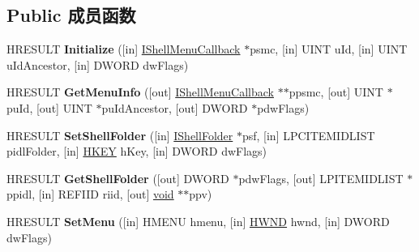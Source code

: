 \subsection*{Public 成员函数}
\begin{DoxyCompactItemize}
\item 
\mbox{\label{interface_i_shell_menu_a96d9507bef0bb926b6185d1bac06fb03}} 
H\+R\+E\+S\+U\+LT {\bfseries Initialize} (\mbox{[}in\mbox{]} \hyperlink{interface_i_shell_menu_callback}{I\+Shell\+Menu\+Callback} $\ast$psmc, \mbox{[}in\mbox{]} U\+I\+NT u\+Id, \mbox{[}in\mbox{]} U\+I\+NT u\+Id\+Ancestor, \mbox{[}in\mbox{]} D\+W\+O\+RD dw\+Flags)
\item 
\mbox{\label{interface_i_shell_menu_a45d493f271fe3248526d3bc00c55356f}} 
H\+R\+E\+S\+U\+LT {\bfseries Get\+Menu\+Info} (\mbox{[}out\mbox{]} \hyperlink{interface_i_shell_menu_callback}{I\+Shell\+Menu\+Callback} $\ast$$\ast$ppsmc, \mbox{[}out\mbox{]} U\+I\+NT $\ast$pu\+Id, \mbox{[}out\mbox{]} U\+I\+NT $\ast$pu\+Id\+Ancestor, \mbox{[}out\mbox{]} D\+W\+O\+RD $\ast$pdw\+Flags)
\item 
\mbox{\label{interface_i_shell_menu_a03ca104a4dc54899cb48d5b8d89bf9a3}} 
H\+R\+E\+S\+U\+LT {\bfseries Set\+Shell\+Folder} (\mbox{[}in\mbox{]} \hyperlink{interface_i_shell_folder}{I\+Shell\+Folder} $\ast$psf, \mbox{[}in\mbox{]} L\+P\+C\+I\+T\+E\+M\+I\+D\+L\+I\+ST pidl\+Folder, \mbox{[}in\mbox{]} \hyperlink{interfacevoid}{H\+K\+EY} h\+Key, \mbox{[}in\mbox{]} D\+W\+O\+RD dw\+Flags)
\item 
\mbox{\label{interface_i_shell_menu_a7fb29d4996c63fd7756141ceab76e294}} 
H\+R\+E\+S\+U\+LT {\bfseries Get\+Shell\+Folder} (\mbox{[}out\mbox{]} D\+W\+O\+RD $\ast$pdw\+Flags, \mbox{[}out\mbox{]} L\+P\+I\+T\+E\+M\+I\+D\+L\+I\+ST $\ast$ppidl, \mbox{[}in\mbox{]} R\+E\+F\+I\+ID riid, \mbox{[}out\mbox{]} \hyperlink{interfacevoid}{void} $\ast$$\ast$ppv)
\item 
\mbox{\label{interface_i_shell_menu_ae87f3b34b1464131c53b4a10717e32d4}} 
H\+R\+E\+S\+U\+LT {\bfseries Set\+Menu} (\mbox{[}in\mbox{]} H\+M\+E\+NU hmenu, \mbox{[}in\mbox{]} \hyperlink{interfacevoid}{H\+W\+ND} hwnd, \mbox{[}in\mbox{]} D\+W\+O\+RD dw\+Flags)
\item 
\mbox{\label{interface_i_shell_menu_ae60ed2dc0ad98636b7200e80032067e7}} 

\end{DoxyCompactItemize}
